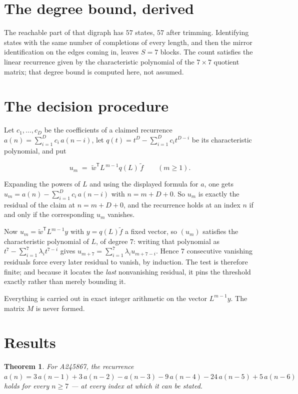 \documentclass[11pt]{article}
\newtheorem{theorem}{Theorem}
\theoremstyle{definition}
\begin{document}
\section{The degree bound, derived}

The reachable part of that digraph has $57$ states, $57$ after trimming. Identifying states with the same number of completions of every length, and then the mirror identification on the edges coming in, leaves $S = 7$ blocks. The count satisfies the linear recurrence given by the characteristic polynomial of the $7\times7$ quotient matrix; that degree bound is computed here, not assumed.

\section{The decision procedure}

Let $c_1,\dots,c_D$ be the coefficients of a claimed recurrence $a(n) = \sum_{i=1}^{D} c_i\,a(n-i)$, let $q(t) = t^{D} - \sum_{i=1}^{D} c_i t^{D-i}$ be its characteristic polynomial, and put

\[u_m \;=\; \tilde w^{\mathsf T} L^{\,m-1} q(L)\,\tilde f \qquad (m \ge 1).\]

Expanding the powers of $L$ and using the displayed formula for $a$, one gets $u_m = a(n) - \sum_{i=1}^{D} c_i\,a(n-i)$ with $n = m + D + 0$. So $u_m$ is exactly the residual of the claim at $n = m + D + 0$, and the recurrence holds at an index $n$ if and only if the corresponding $u_m$ vanishes.

Now $u_m = \tilde w^{\mathsf T} L^{m-1} y$ with $y = q(L)\tilde f$ a fixed vector, so $(u_m)$ satisfies the characteristic polynomial of $L$, of degree $7$: writing that polynomial as $t^{7} - \sum_{i=1}^{7} \lambda_i t^{7-i}$ gives $u_{m+7} = \sum_{i=1}^{7} \lambda_i u_{m+7-i}$. Hence $7$ consecutive vanishing residuals force every later residual to vanish, by induction. The test is therefore finite; and because it locates the {\itshape last} nonvanishing residual, it pins the threshold exactly rather than merely bounding it.

Everything is carried out in exact integer arithmetic on the vector $L^{m-1}y$. The matrix $M$ is never formed.

\section{Results}

\begin{theorem} For A245867, the recurrence $a(n) = 3\,a(n-1) + 3\,a(n-2) - a(n-3) - 9\,a(n-4) - 24\,a(n-5) + 5\,a(n-6)$ holds for every $n \ge 7$ --- at every index at which it can be stated.\end{theorem}
\end{document}
